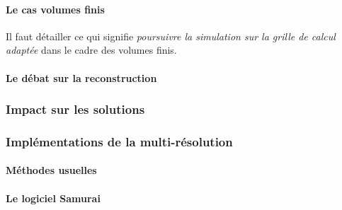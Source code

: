     \paragraph{Le cas volumes finis}
            Il faut détailler ce qui signifie \textit{poursuivre la simulation sur la grille de calcul adaptée} dans le cadre des volumes finis.
            
    \paragraph{Le débat sur la reconstruction}
\subsubsection{Impact sur les solutions}
    \paragraph{}
    \paragraph{}
\subsubsection{Implémentations de la multi-résolution}
    \paragraph{Méthodes usuelles}
    \paragraph{Le logiciel Samurai}